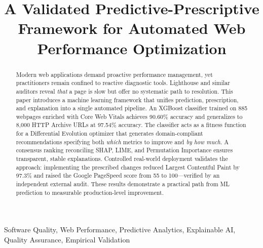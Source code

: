 \documentclass[conference]{IEEEtran}
\begin{document}
\title{A Validated Predictive-Prescriptive Framework for Automated Web Performance Optimization\\
}

\author{
\and
{}
}

\maketitle

\begin{abstract}
Modern web applications demand proactive performance management, yet practitioners remain confined to reactive diagnostic tools. Lighthouse and similar auditors reveal \textit{that} a page is slow but offer no systematic path to resolution. This paper introduces a machine learning framework that unifies prediction, prescription, and explanation into a single automated pipeline. An XGBoost classifier trained on 885 webpages enriched with Core Web Vitals achieves 90.60\% accuracy and generalizes to 8,000 HTTP Archive URLs at 97.54\% accuracy. The classifier acts as a fitness function for a Differential Evolution optimizer that generates domain-compliant recommendations specifying both \textit{which} metrics to improve and \textit{by how much}. A consensus ranking reconciling SHAP, LIME, and Permutation Importance ensures transparent, stable explanations. Controlled real-world deployment validates the approach: implementing the prescribed changes reduced Largest Contentful Paint by 97.3\% and raised the Google PageSpeed score from 55 to 100---verified by an independent external audit. These results demonstrate a practical path from ML prediction to measurable production-level improvement.
\end{abstract}

\begin{IEEEkeywords}
Software Quality, Web Performance, Predictive Analytics, Explainable AI, Quality Assurance, Empirical Validation
\end{IEEEkeywords}
\end{document}
